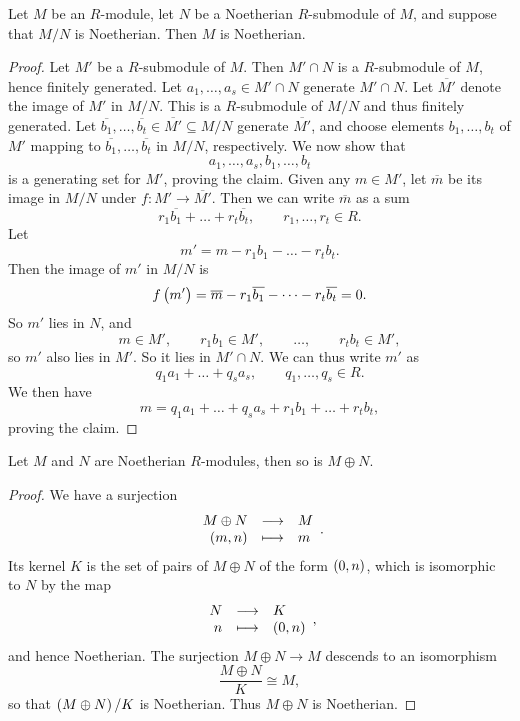 \pagebreak

\begin{proposition}
Let $ M $ be an $ R $-module, let $ N $ be a Noetherian $ R $-submodule of $ M $, and suppose that $ M / N $ is Noetherian. Then $ M $ is Noetherian.
\end{proposition}

\begin{proof}
Let $ M' $ be a $ R $-submodule of $ M $. Then $ M' \cap N $ is a $ R $-submodule of $ M $, hence finitely generated. Let $ a_1, \dots, a_s \in M' \cap N $ generate $ M' \cap N $. Let $ \overline{M'} $ denote the image of $ M' $ in $ M / N $. This is a $ R $-submodule of $ M / N $ and thus finitely generated. Let $ \overline{b_1}, \dots, \overline{b_t} \in \overline{M'} \subseteq M / N $ generate $ \overline{M'} $, and choose elements $ b_1, \dots, b_t $ of $ M' $ mapping to $ \overline{b_1}, \dots, \overline{b_t} $ in $ M / N $, respectively. We now show that
$$ a_1, \dots, a_s, b_1, \dots, b_t $$
is a generating set for $ M' $, proving the claim. Given any $ m \in M' $, let $ \overline{m} $ be its image in $ M / N $ under $ f : M' \to \overline{M'} $. Then we can write $ \overline{m} $ as a sum
$$ r_1\overline{b_1} + \dots + r_t\overline{b_t}, \qquad r_1, \dots, r_t \in R. $$
Let
$$ m' = m - r_1b_1 - \dots - r_tb_t. $$
Then the image of $ m' $ in $ M / N $ is
$$ f\br{m'} = \overline{m} - r_1\overline{b_1} - \dots - r_t\overline{b_t} = 0. $$
So $ m' $ lies in $ N $, and
$$ m \in M', \qquad r_1b_1 \in M', \qquad \dots, \qquad r_tb_t \in M', $$
so $ m' $ also lies in $ M' $. So it lies in $ M' \cap N $. We can thus write $ m' $ as
$$ q_1a_1 + \dots + q_sa_s, \qquad q_1, \dots, q_s \in R. $$
We then have
$$ m = q_1a_1 + \dots + q_sa_s + r_1b_1 + \dots + r_tb_t, $$
proving the claim.
\end{proof}

\begin{corollary}
Let $ M $ and $ N $ are Noetherian $ R $-modules, then so is $ M \oplus N $.
\end{corollary}

\begin{proof}
We have a surjection
$$ \function{M \oplus N}{M}{\br{m, n}}{m}. $$
Its kernel $ K $ is the set of pairs of $ M \oplus N $ of the form $ \br{0, n} $, which is isomorphic to $ N $ by the map
$$ \function{N}{K}{n}{\br{0, n}}, $$
and hence Noetherian. The surjection $ M \oplus N \to M $ descends to an isomorphism
$$ \dfrac{M \oplus N}{K} \cong M, $$
so that $ \br{M \oplus N} / K $ is Noetherian. Thus $ M \oplus N $ is Noetherian.
\end{proof}

